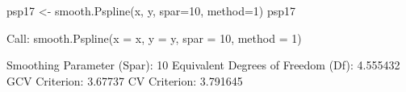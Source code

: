 \begin{Schunk}
\begin{Sinput}
 psp17 <- smooth.Pspline(x, y, spar=10, method=1)
 psp17
\end{Sinput}
\begin{Soutput}
Call:
smooth.Pspline(x = x, y = y, spar = 10, method = 1)

Smoothing Parameter (Spar): 10 
Equivalent Degrees of Freedom (Df): 4.555432 
GCV Criterion: 3.67737 
CV  Criterion: 3.791645 
\end{Soutput}
\end{Schunk}
